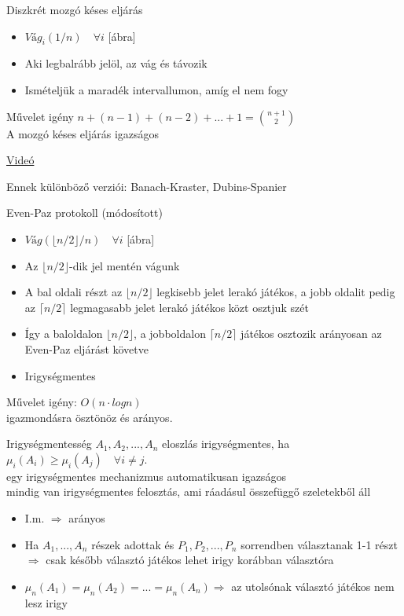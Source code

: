 	\begin{definition}{Diszkrét mozgó késes eljárás}{}
		\begin{itemize}
			\item $Vág_i(1/n) \quad \forall i $ [ábra]
			\item Aki legbalrább jelöl, az vág és távozik
			\item Ismételjük a maradék intervallumon, amíg el nem fogy
		\end{itemize}
		Művelet igény $n+(n-1)+(n-2)+...+1 =\binom{n+1}{2}$\\
		A mozgó késes eljárás igazságos
	\end{definition}
	\href{https://youtu.be/GeEghYnuVps?si=soXOO_Iw5EsowTf3}{Videó}
	
	Ennek különböző verziói: Banach-Kraster, Dubins-Spanier
	
	\begin{definition}{Even-Paz protokoll (módosított)}{}
		
		\begin{itemize}
			\item $Vág(\lfloor n/2 \rfloor /n) \quad \forall i$ [ábra] 
			\item Az $\lfloor n/2 \rfloor$-dik jel mentén vágunk
			\item A bal oldali részt az $\lfloor n/2 \rfloor$ legkisebb jelet lerakó játékos, a jobb oldalit pedig az $\lceil n/2 \rceil$ legmagasabb jelet lerakó játékos közt osztjuk szét
			\item Így a baloldalon $\lfloor n/2 \rfloor$, a jobboldalon $\lceil n/2 \rceil$ játékos osztozik arányosan az Even-Paz eljárást követve
			\item Irigységmentes
		\end{itemize}
		Művelet igény: $O(n\cdot logn)$ \\
		 igazmondásra ösztönöz és arányos.
	\end{definition}

	\begin{definition}{Irigységmentesség}{}
		$A_1, A_2, ..., A_n$ eloszlás irigységmentes, ha $\mu_i(A_i) \geq \mu_i(A_j) \quad \forall i\neq j$.\\
		egy irigységmentes mechanizmus automatikusan igazságos\\
		mindig van irigységmentes felosztás, ami ráadásul összefüggő
		szeletekből áll
	\end{definition}
	
	\begin{observation}{}{}
		\begin{itemize}
			\item I.m. $\Rightarrow$ arányos
			\item Ha $A_1,...,A_n$ részek adottak és $P_1,P_2,...,P_n$ sorrendben választanak 1-1 részt $\Rightarrow$ csak később választó játékos lehet irigy korábban választóra
			\item $\mu_n(A_1) = \mu_n(A_2) = ... = \mu_n(A_n) \Rightarrow $ az utolsónak választó játékos nem lesz irigy 
		\end{itemize}
	\end{observation}
	
